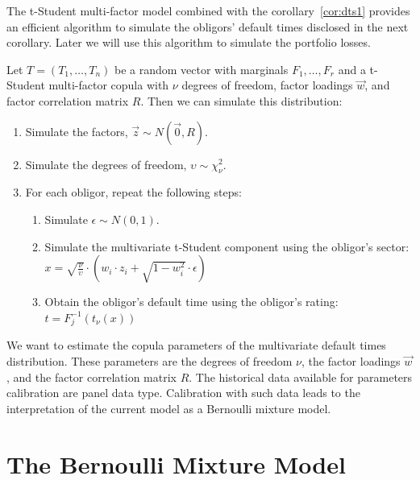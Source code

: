 \documentclass[11pt,fleqn]{book} %
\begin{document}
The t-Student multi-factor model combined with the corollary~\ref{cor:dts1} 
provides an efficient algorithm to simulate the obligors' default times 
disclosed in the next corollary. Later we will use this algorithm to simulate
the portfolio losses.

\begin{corollary}
	\label{cor:dts2}
	Let $T=(T_1, \dots, T_n)$ be a random vector with marginals 
	$F_1, \dots, F_r$ and a t-Student multi-factor copula with 
	$\nu$ degrees of freedom, factor loadings $\vec{w}$, and factor correlation 
	matrix $R$. Then we can simulate this distribution:
	\begin{enumerate}
		\item Simulate the factors, $\vec{z} \sim N(\vec{0},R)$.
		\item Simulate the degrees of freedom, $\upsilon \sim \chi_{\nu}^2$.
		\item For each obligor, repeat the following steps:
		\begin{enumerate}
			\item Simulate $\epsilon \sim N(0,1)$.
			\item Simulate the multivariate t-Student component using the obligor's sector:\\
			$
				x = \sqrt{\frac{\nu}{\upsilon}} \cdot \left( w_i \cdot z_i + \sqrt{1-w_i^2} \cdot \epsilon \right)
			$
			\item Obtain the obligor's default time using the obligor's rating:\\
			$
				t = F_j^{-1}\left(t_{\nu}(x)\right)
			$
		\end{enumerate}
	\end{enumerate}
\end{corollary}

We want to estimate the copula parameters of the multivariate default times
distribution. These parameters are the degrees of freedom $\nu$, the factor 
loadings $\vec{w}$, and the factor correlation matrix $R$. The historical 
data available for parameters calibration are panel data type. Calibration 
with such data leads to the interpretation of the current model as a Bernoulli 
mixture model.

\section{The Bernoulli Mixture Model}
\end{document}
